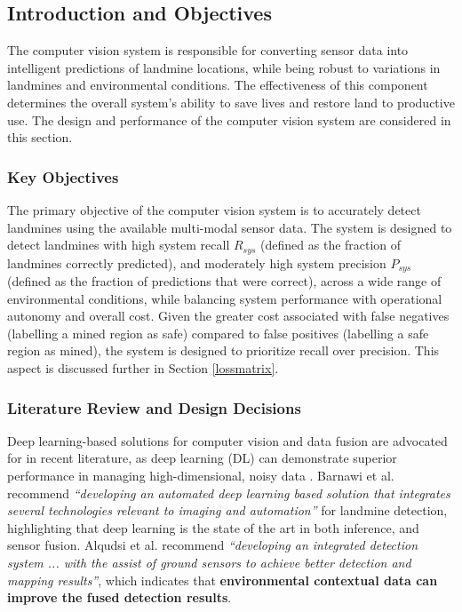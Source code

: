 \subsection{Introduction and Objectives} \label{compvis_intro}

     \noindent The computer vision system is responsible for converting sensor data into intelligent predictions of landmine locations, while being robust to variations in landmines and environmental conditions. The effectiveness of this component determines the overall system’s ability to save lives and restore land to productive use. The design and performance of the computer vision system are considered in this section. 
     
    \subsubsection{Key Objectives}
    
        \noindent The primary objective of the computer vision system is to accurately detect landmines using the available multi-modal sensor data. The system is designed to detect landmines with high system recall $R_{sys}$ (defined as the fraction of landmines correctly predicted), and moderately high system precision $P_{sys}$ (defined as the fraction of predictions that were correct), across a wide range of environmental conditions, while balancing system performance with operational autonomy and overall cost. Given the greater cost associated with false negatives (labelling a mined region as safe) compared to false positives (labelling a safe region as mined), the system is designed to prioritize recall over precision. This aspect is discussed further in Section \ref{lossmatrix}.

    \subsubsection{Literature Review and Design Decisions} 
    
        Deep learning-based solutions for computer vision and data fusion are advocated for in recent literature, as deep learning (DL) can demonstrate superior performance in managing high-dimensional, noisy data \cite{Li2023Robust}. Barnawi et al. \cite{barnawi2022review} recommend \textit{``developing an automated deep learning based solution that integrates several technologies relevant to imaging and automation''} for landmine detection, highlighting that deep learning is the state of the art in both inference, and sensor fusion. Alqudsi et al. \cite{alqudsi2021review} recommend \textit{``developing an integrated detection system ... with the assist of ground sensors to achieve better detection and mapping results''}, which indicates that \textbf{environmental contextual data can improve the fused detection results}.
    
